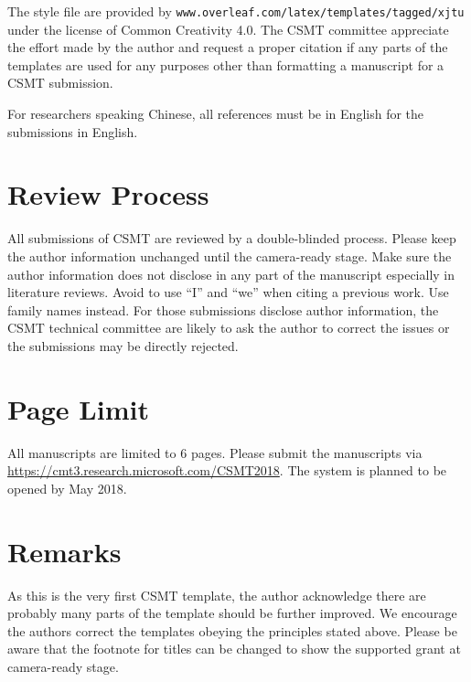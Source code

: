 \documentclass[UTF8,a4paper]{article}
\begin{document}
The style file are provided by \texttt{www.overleaf.com/latex/templates/tagged/xjtu} under the license of Common Creativity 4.0. The CSMT committee appreciate the effort made by the author and request a proper citation if any parts of the templates are used for any purposes other than formatting a manuscript for a CSMT submission.

For researchers speaking Chinese, all references must be in English for the submissions in English.

\section{Review Process}

All submissions of CSMT are reviewed by a double-blinded process. Please keep the author information unchanged until the camera-ready stage. Make sure the author information does not disclose in any part of the manuscript especially in literature reviews. Avoid to use ``I'' and ``we'' when citing a previous work. Use family names instead. For those submissions disclose author information, the CSMT technical committee are likely to ask the author to correct the issues or the submissions may be directly rejected.

\section{Page Limit}

All manuscripts are limited to 6 pages. Please submit the manuscripts via \url{https://cmt3.research.microsoft.com/CSMT2018}. The system is planned to be opened by May 2018.

\section{Remarks}
As this is the very first CSMT template, the author acknowledge there are probably many parts of the template should be further improved. We encourage the authors correct the templates obeying the principles stated above. Please be aware that the footnote for titles can be changed to show the supported grant at camera-ready stage.



\end{document}
